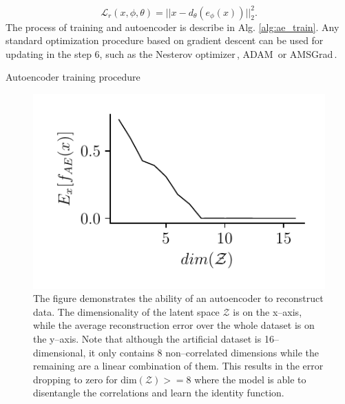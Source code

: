 \begin{equation}
\mathcal{L}_{r}(x,\phi,\theta)=||x-d_{\theta}(e_{\phi}(x))||_{2}^{2}.\label{eq:ae_loss}
\end{equation}
The process of training and autoencoder is describe in Alg. \ref{alg:ae_train}.
Any standard optimization procedure based on gradient descent can
be used for updating in the step 6, such as the Nesterov optimizer\,\cite{nesterov1983method},
ADAM\,\cite{kingma2014adam} or AMSGrad\,\cite{reddi2019convergence}.
\begin{algorithm}

\caption{Autoencoder training procedure}
\label{alg:ae_train}

\end{algorithm}

\begin{figure}
\begin{centering}
\includegraphics[scale=0.85]{data/chapter_intro/ae_reconstruction}\caption{The figure demonstrates the ability of an autoencoder to reconstruct
data. The dimensionality of the latent space $\mathcal{Z}$ is on
the x--axis, while the average reconstruction error over the whole
dataset is on the y--axis. Note that although the artificial dataset
is 16--dimensional, it only contains 8 non--correlated dimensions
while the remaining are a linear combination of them. This results
in the error dropping to zero for $\text{dim}(\mathcal{Z})>=8$ where
the model is able to disentangle the correlations and learn the identity
function.}
\label{fig:ae_reconstruction}
\par\end{centering}
\end{figure}

